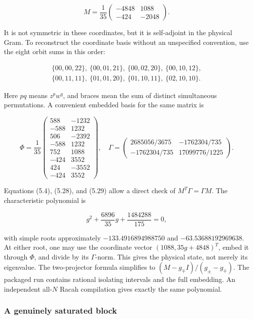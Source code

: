 \[
M=\frac1{35}\begin{pmatrix}-4848&1088\\-424&-2048\end{pmatrix}.
\tag{5.28}
\]

It is not symmetric in these coordinates, but it is self-adjoint in the physical Gram. To reconstruct the coordinate basis without an unspecified convention, use the eight orbit sums in this order:

\[
\begin{gathered}
\{00,00,22\},\ \{00,01,21\},\ \{00,02,20\},\ \{00,10,12\},\\
\{00,11,11\},\ \{01,01,20\},\ \{01,10,11\},\ \{02,10,10\}.
\end{gathered}
\]

Here \(pq\) means \(z^pw^q\), and braces mean the sum of distinct simultaneous permutations. A convenient embedded basis for the same matrix is

\[
\Phi=\frac1{35}
\begin{pmatrix}
588&-1232\\-588&1232\\506&-2392\\-588&1232\\
752&1088\\-424&3552\\424&-3552\\-424&3552
\end{pmatrix},
\quad
\Gamma=\begin{pmatrix}
2685056/3675&-1762304/735\\
-1762304/735&17099776/1225
\end{pmatrix}.
\tag{5.29}
\]

Equations (5.4), (5.28), and (5.29) allow a direct check of \(M^T\Gamma=\Gamma M\). The characteristic polynomial is

\[
g^2+\frac{6896}{35}g+\frac{1484288}{175}=0,
\tag{5.30}
\]

with simple roots approximately \(-133.4916894988750\) and \(-63.53688192969638\). At either root, one may use the coordinate vector \((1088,35g+4848)^T\), embed it through \(\Phi\), and divide by its \(\Gamma\)-norm. This gives the physical state, not merely its eigenvalue. The two-projector formula simplifies to \((M-g_{\mp}I)/(g_{\pm}-g_{\mp})\). The packaged run contains rational isolating intervals and the full embedding. An independent all-\(N\) Racah compilation gives exactly the same polynomial.

\hypertarget{a-genuinely-saturated-block}{%
\subsubsection{A genuinely saturated block}\label{a-genuinely-saturated-block}}

